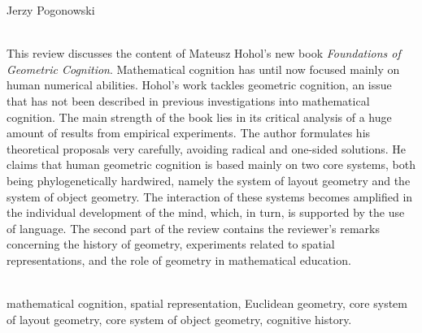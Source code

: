 \begin{newrevplenv}{Jerzy Pogonowski}




\vspace{5mm}%
\begin{flushright}
{\chaptitleeng\color{black!50}{Geometric cognition\\from a~cognitive point of view}}
\end{flushright}

{}\\
{This review discusses the content of Mateusz Hohol's new book {\em
Foundations  of Geometric Cognition}. Mathematical cognition has
until now focused mainly on human numerical abilities. Hohol's
work tackles geometric cognition, an issue that has not been
described in previous investigations into mathematical cognition.
The main strength of the book lies in its critical analysis of a
huge amount of results from empirical experiments. The author
formulates his theoretical proposals very carefully, avoiding
radical and one-sided solutions. He claims that human geometric
cognition is based mainly on two core systems, both being
phylogenetically hardwired, namely the system of layout geometry
and the system of object geometry. The interaction of these
systems becomes amplified in the individual development of the
mind, which, in turn, is supported by the use of language. The
second part of the review contains the reviewer's remarks
concerning the history of geometry, experiments related to spatial
representations, and the role of geometry in mathematical
education.}\par%
\vspace{2mm}%
{}\\%
{mathematical cognition, spatial representation,
Euclidean geometry, core system of layout geometry, core system of
object geometry, cognitive history.}%





\end{newrevplenv}
